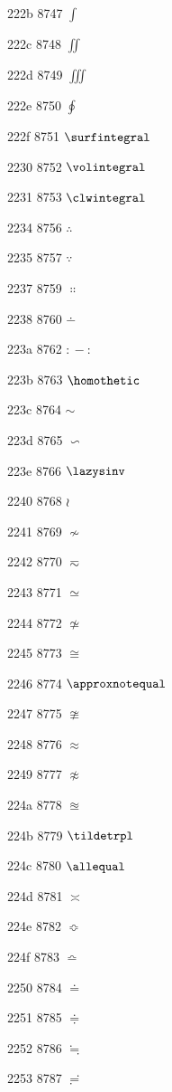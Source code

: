 \documentclass[11pt]{article}
\begin{document}
222b 8747 \ensuremath{\int}

222c 8748 \ensuremath{\iint}

222d 8749 \ensuremath{\iiint}

222e 8750 \ensuremath{\oint}

222f 8751 \ensuremath{\surfintegral}

2230 8752 \ensuremath{\volintegral}

2231 8753 \ensuremath{\clwintegral}

2234 8756 \ensuremath{\therefore}

2235 8757 \ensuremath{\because}

2237 8759 \ensuremath{\Colon}

2238 8760 \ensuremath{\dotminus}

223a 8762 \ensuremath{\mathbin{{:}\!\!{-}\!\!{:}}}

223b 8763 \ensuremath{\homothetic}

223c 8764 \ensuremath{\sim}

223d 8765 \ensuremath{\backsim}

223e 8766 \ensuremath{\lazysinv}

2240 8768 \ensuremath{\wr}

2241 8769 \ensuremath{\nsim}

2242 8770 \ensuremath{\eqsim}

2243 8771 \ensuremath{\simeq}

2244 8772 \ensuremath{\nsime}

2245 8773 \ensuremath{\cong}

2246 8774 \ensuremath{\approxnotequal}

2247 8775 \ensuremath{\ncong}

2248 8776 \ensuremath{\approx}

2249 8777 \ensuremath{\napprox}

224a 8778 \ensuremath{\approxeq}

224b 8779 \ensuremath{\tildetrpl}

224c 8780 \ensuremath{\allequal}

224d 8781 \ensuremath{\asymp}

224e 8782 \ensuremath{\Bumpeq}

224f 8783 \ensuremath{\bumpeq}

2250 8784 \ensuremath{\doteq}

2251 8785 \ensuremath{\doteqdot}

2252 8786 \ensuremath{\fallingdotseq}

2253 8787 \ensuremath{\risingdotseq}
\end{document}
